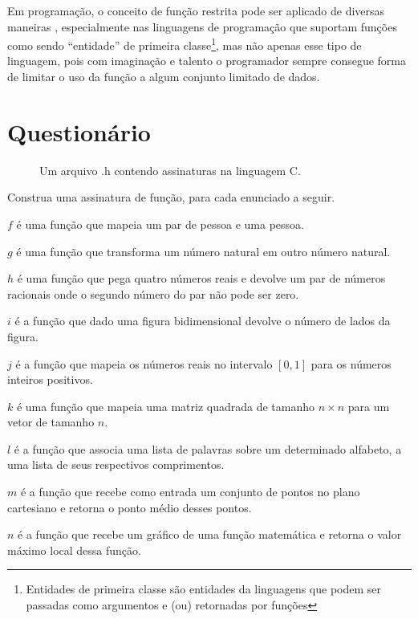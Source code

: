 Em programação, o conceito de função restrita pode ser aplicado de diversas maneiras \cite{paulo2009algoritmos, pythonOrg}, especialmente nas linguagens de programação que suportam funções como sendo ``entidade'' de primeira classe\footnote{Entidades de primeira classe são entidades da linguagens que podem ser passadas como argumentos e (ou) retornadas por funções}, mas não apenas esse tipo de linguagem, pois com imaginação e talento o programador sempre consegue forma de limitar o uso da função a algum conjunto limitado de dados.

\section{Questionário}\label{sec:Questionario5part1}

\begin{figure}[h]
	
	\caption{Um arquivo .h contendo assinaturas na linguagem C.}
	\label{fig:ListaAssinaturas}
\end{figure}

\begin{questao}\label{prob:Funcao1}
	Construa uma assinatura de função, para cada enunciado a seguir.
\end{questao}

\begin{exerList}
	\item $f$ é uma função que mapeia um par de pessoa e uma  pessoa.
	\item $g$ é uma função que transforma um número natural em outro número natural.
	\item $h$ é uma função que pega quatro números reais e devolve um par de números racionais onde o segundo número do par não pode ser zero.
	\item $i$ é a função que dado uma figura bidimensional devolve o número de lados da figura.
	\item $j$ é a função que mapeia os números reais no intervalo $[0, 1]$ para os números inteiros positivos.
	\item $k$ é uma função que mapeia uma matriz quadrada de tamanho $n \times n$ para um vetor de tamanho $n$.
	\item $l$ é a função que associa uma lista de palavras sobre um determinado alfabeto, a uma lista de seus respectivos comprimentos.
	\item $m$ é a função que recebe como entrada um conjunto de pontos no plano cartesiano e retorna o ponto médio desses pontos.
	\item $n$ é a função que recebe um gráfico de uma função matemática e retorna o valor máximo local dessa função.
\end{exerList}


